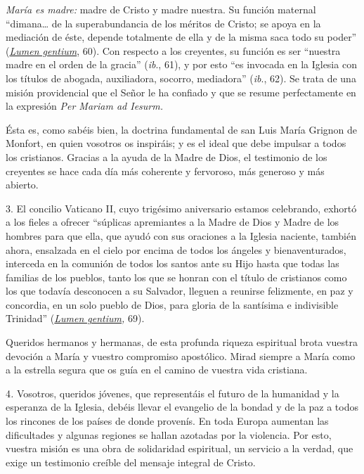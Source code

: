 \emph{María es madre:} madre de Cristo y madre nuestra. Su función
maternal ``dimana\ldots{} de la superabundancia de los méritos de
Cristo; se apoya en la mediación de éste, depende totalmente de ella y
de la misma saca todo su poder''
(\emph{\href{http://www.vatican.va/archive/hist_councils/ii_vatican_council/documents/vat-ii_const_19641121_lumen-gentium_sp.html}{Lumen
		gentium}}, 60). Con respecto a los creyentes, su función es ser
``nuestra madre en el orden de la gracia'' (\emph{ib}., \emph{} 61), y
por esto ``es invocada en la Iglesia con los títulos de abogada,
auxiliadora, socorro, mediadora'' (\emph{ib}., 62). Se trata de una
misión providencial que el Señor le ha confiado y que se resume
perfectamente en la expresión \emph{Per Mariam ad Iesurm.}

Ésta es, como sabéis bien, la doctrina fundamental de san Luis María
Grignon de Monfort, en quien vosotros os inspiráis; y es el ideal que
debe impulsar a todos los cristianos. Gracias a la ayuda de la Madre de
Dios, el testimonio de los creyentes se hace cada día más coherente y
fervoroso, más generoso y más abierto.

3. El concilio Vaticano II, cuyo trigésimo aniversario estamos
celebrando, exhortó a los fieles a ofrecer ``súplicas apremiantes a la
Madre de Dios y Madre de los hombres para que ella, que ayudó con sus
oraciones a la Iglesia naciente, también ahora, ensalzada en el cielo
por encima de todos los ángeles y bienaventurados, interceda en la
comunión de todos los santos ante su Hijo hasta que todas las familias
de los pueblos, tanto los que se honran con el título de cristianos como
los que todavía desconocen a su Salvador, lleguen a reunirse felizmente,
en paz y concordia, en un solo pueblo de Dios, para gloria de la
santísima e indivisible Trinidad''
(\emph{\href{http://www.vatican.va/archive/hist_councils/ii_vatican_council/documents/vat-ii_const_19641121_lumen-gentium_sp.html}{Lumen
		gentium},} 69).

Queridos hermanos y hermanas, de esta profunda riqueza espiritual brota
vuestra devoción a María y vuestro compromiso apostólico. Mirad siempre
a María como a la estrella segura que os guía en el camino de vuestra
vida cristiana.

4\emph{.} Vosotros, queridos jóvenes, que representáis el futuro de la
humanidad y la esperanza de la Iglesia, debéis llevar el evangelio de la
bondad y de la paz a todos los rincones de los países de donde provenís.
En toda Europa aumentan las dificultades y algunas regiones se hallan
azotadas por la violencia. Por esto, vuestra misión es una obra de
solidaridad espiritual, un servicio a la verdad, que exige un testimonio
creíble del mensaje integral de Cristo.

